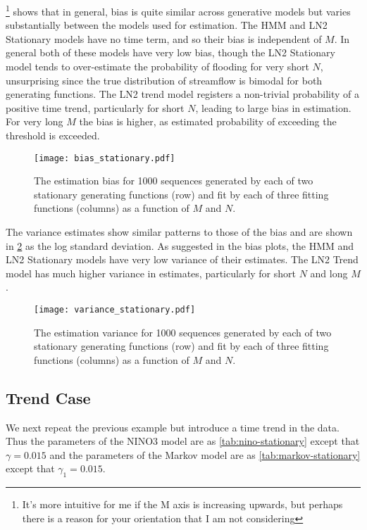 \documentclass[12pt]{article}
\begin{document}
\footnote{It's more intuitive for me if the M axis is increasing upwards, but perhaps there is a reason for your orientation that I am not considering} shows that in general, bias is quite similar across generative models but varies substantially between the models used for estimation.
The HMM and LN2 Stationary models have no time term, and so their bias is independent of $M$.
In general both of these models have very low bias, though the LN2 Stationary model tends to over-estimate the probability of flooding for very short $N$, unsurprising since the true distribution of streamflow is bimodal for both generating functions. 
The LN2 trend model registers a non-trivial probability of a positive time trend, particularly for short $N$, leading to large bias in estimation.
For very long $M$ the bias is higher, as estimated probability of exceeding the threshold is exceeded.
\begin{figure}[ht]
  \texttt{[image: bias\_stationary.pdf]}
  \caption{The estimation bias for 1000 sequences generated by each of two stationary generating functions (row) and fit by each of three fitting functions (columns) as a function of $M$ and $N$.\label{fig:stationary-bias}}
\end{figure}

The variance estimates show similar patterns to those of the bias and are shown in \cref{fig:stationary-variance} as the log standard deviation.
As suggested in the bias plots, the HMM and LN2 Stationary models have very low variance of their estimates.
The LN2 Trend model has much higher variance in estimates, particularly for short $N$ and long $M$.
\begin{figure}[ht]
  \texttt{[image: variance\_stationary.pdf]}
  \caption{The estimation variance for 1000 sequences generated by each of two stationary generating functions (row) and fit by each of three fitting functions (columns) as a function of $M$ and $N$.\label{fig:stationary-variance}}
\end{figure}

\subsection{Trend Case}

We next repeat the previous example but introduce a time trend in the data.
Thus the parameters of the NINO3 model are as \cref{tab:nino-stationary} except that $\gamma=0.015$ and the parameters of the Markov model are as \cref{tab:markov-stationary} except that $\gamma_1 = 0.015$.
\end{document}

